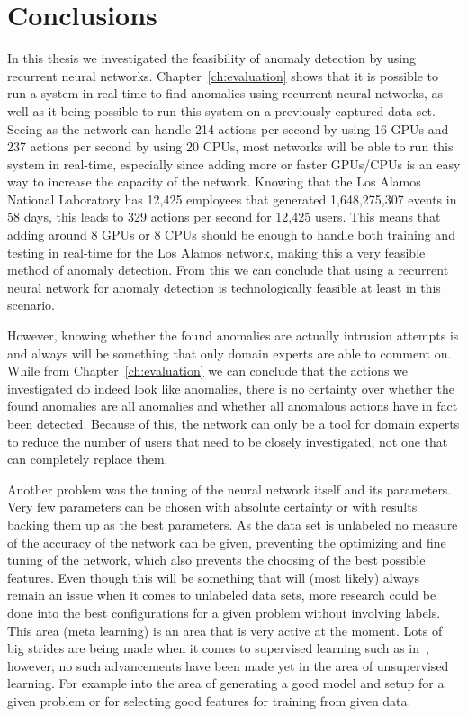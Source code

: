 \chapter{Conclusions}\label{ch:conclusions}

In this thesis we investigated the feasibility of anomaly detection by using recurrent neural networks. Chapter~\ref{ch:evaluation} shows that it is possible to run a system in real-time to find anomalies using recurrent neural networks, as well as it being possible to run this system on a previously captured data set. Seeing as the network can handle 214 actions per second by using 16 GPUs and 237 actions per second by using 20 CPUs, most networks will be able to run this system in real-time, especially since adding more or faster GPUs/CPUs is an easy way to increase the capacity of the network. Knowing that the Los Alamos National Laboratory has 12,425 employees that generated 1,648,275,307 events in 58 days, this leads to 329 actions per second for 12,425 users. This means that adding around 8 GPUs or 8 CPUs should be enough to handle both training and testing in real-time for the Los Alamos network, making this a very feasible method of anomaly detection. From this we can conclude that using a recurrent neural network for anomaly detection is technologically feasible at least in this scenario. 

However, knowing whether the found anomalies are actually intrusion attempts is and always will be something that only domain experts are able to comment on. While from Chapter~\ref{ch:evaluation} we can conclude that the actions we investigated do indeed look like anomalies, there is no certainty over whether the found anomalies are all anomalies and whether all anomalous actions have in fact been detected. Because of this, the network can only be a tool for domain experts to reduce the number of users that need to be closely investigated, not one that can completely replace them. 

Another problem was the tuning of the neural network itself and its parameters. Very few parameters can be chosen with absolute certainty or with results backing them up as the best parameters. As the data set is unlabeled no measure of the accuracy of the network can be given, preventing the optimizing and fine tuning of the network, which also prevents the choosing of the best possible features. Even though this will be something that will (most likely) always remain an issue when it comes to unlabeled data sets, more research could be done into the best configurations for a given problem without involving labels. This area (meta learning) is an area that is very active at the moment. Lots of big strides are being made when it comes to supervised learning such as in~\cite{zoph2016neural}, however, no such advancements have been made yet in the area of unsupervised learning. For example into the area of generating a good model and setup for a given problem or for selecting good features for training from given data.